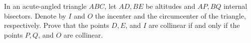In an acute-angled triangle $ABC$, let $AD, BE$ be altitudes and $AP, BQ$ internal bisectors. Denote by $I$ and $O$ the incenter and the circumcenter of the triangle, respectively. Prove that the points $D, E$, and $I$ are collinear if and only if the points $P, Q$, and $O$ are collinear.

